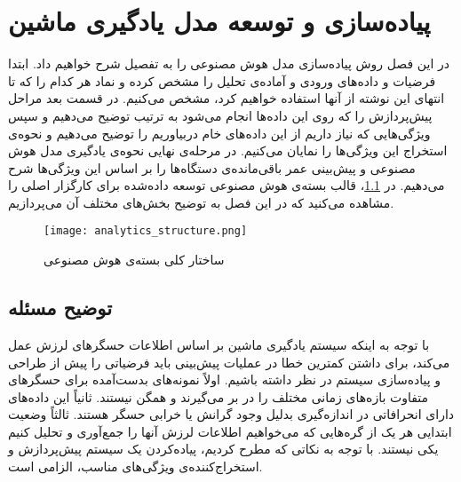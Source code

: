 \chapter{پیاده‌سازی و توسعه مدل یادگیری ماشین}

در این فصل روش پیاده‌سازی مدل هوش مصنوعی را به تفصیل شرح خواهیم داد. ابتدا فرضیات و داده‌های ورودی و آماده‌ی تحلیل را مشخص کرده و نماد هر کدام را که تا انتهای این نوشته از آنها استفاده خواهیم کرد، مشخص می‌کنیم. در قسمت بعد مراحل پیش‌پردازش را که روی این داده‌ها انجام می‌شود به ترتیب توضیح می‌دهیم و سپس ویژگی‌هایی که نیاز داریم از این داده‌های خام دربیاوریم را توضیح می‌دهیم و نحوه‌ی استخراج این ویژگی‌ها را نمایان می‌کنیم. در مرحله‌ی نهایی نحوه‌ی یادگیری مدل هوش مصنوعی و پیش‌بینی عمر باقی‌مانده‌ی دستگاه‌ها را بر اساس این ویژگی‌ها شرح می‌دهیم. در \cref{fig:analytics_structure}، قالب بسته‌ی هوش مصنوعی توسعه داده‌شده برای کارگزار اصلی را مشاهده می‌کنید که در این فصل به توضیح بخش‌های مختلف آن می‌پردازیم.

\begin{figure}[!h]
\centerline{\texttt{[image: analytics\_structure.png]}}
\caption{ساختار کلی بسته‌ی هوش مصنوعی}
\label{fig:analytics_structure}
\end{figure}


\section{توضیح مسئله}
با توجه به اینکه سیستم یادگیری ماشین بر اساس اطلاعات حسگرهای لرزش عمل می‌کند، برای داشتن کمترین خطا در عملیات پیش‌بینی باید فرضیاتی را پیش از طراحی و پیاده‌سازی سیستم در نظر داشته باشیم. اولاً نمونه‌های بدست‌آمده برای حسگرهای متفاوت بازه‌های زمانی مختلف را در بر می‌گیرند و همگن نیستند. ثانیاً این داده‌های دارای انحرافاتی در اندازه‌گیری بدلیل وجود گرانش یا خرابی حسگر هستند. ثالثاً وضعیت ابتدایی هر یک از گره‌هایی که می‌خواهیم اطلاعات لرزش آنها را جمع‌آوری و تحلیل کنیم یکی نیستند\cite{jung2017vibration}. با توجه به نکاتی که مطرح کردیم، پیاده‌کردن یک سیستم پیش‌پردازش و استخراج‌کننده‌ی ویژگی‌های مناسب، الزامی است. 

